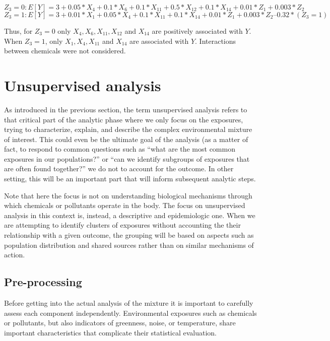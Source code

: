 \documentclass[
]{book}
\begin{document}
\[Z_3=0: E[Y]=3 + 0.05*X_4 + 0.1*X_6 + 0.1*X_{11} + 0.5*X_{12} + 0.1*X_{14} + 0.01*Z_1 + 0.003*Z_2  \]
\[Z_3=1: E[Y]=3 + 0.01*X_1 + 0.05*X_4 + 0.1*X_{11} + 0.1*X_{14} + 0.01*Z_1 + 0.003*Z_2 – 0.32*(Z_3=1) \]

Thus, for \(Z_3=0\) only \(X_4, X_6, X_{11}, X_{12}\) and \(X_{14}\) are positively associated with \(Y\). When \(Z_3=1\), only \(X_1, X_4, X_{11}\) and \(X_{14}\) are associated with \(Y\). Interactions between chemicals were not considered.

\hypertarget{unsupervised-analysis}{%
\chapter{Unsupervised analysis}\label{unsupervised-analysis}}

As introduced in the previous section, the term unsupervised analysis refers to that critical part of the analytic phase where we only focus on the exposures, trying to characterize, explain, and describe the complex environmental mixture of interest. This could even be the ultimate goal of the analysis (as a matter of fact, to respond to common questions such as ``what are the most common exposures in our populations?'' or ``can we identify subgroups of exposures that are often found together?'' we do not to account for the outcome. In other setting, this will be an important part that will inform subsequent analytic steps.

Note that here the focus is not on understanding biological mechanisms through which chemicals or pollutants operate in the body. The focus on unsupervised analysis in this context is, instead, a descriptive and epidemiologic one. When we are attempting to identify clusters of exposures without accounting the their relationship with a given outcome, the grouping will be based on aspects such as population distribution and shared sources rather than on similar mechanisms of action.

\hypertarget{pre-processing}{%
\section{Pre-processing}\label{pre-processing}}

Before getting into the actual analysis of the mixture it is important to carefully assess each component independently. Environmental exposures such as chemicals or pollutants, but also indicators of greenness, noise, or temperature, share important characteristics that complicate their statistical evaluation.
\end{document}
